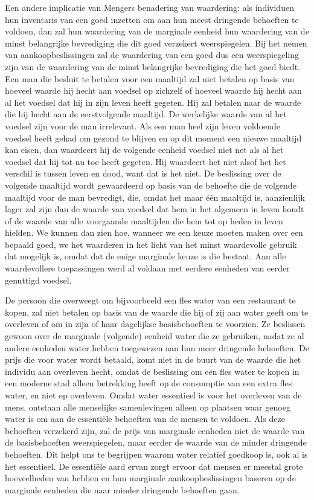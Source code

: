 Een andere implicatie van Mengers benadering van waardering: als individuen hun inventaris van een goed inzetten om aan hun meest dringende behoeften te voldoen, dan zal hun waardering van de marginale eenheid hun waardering van de minst belangrijke bevrediging die dit goed verzekert weerspiegelen. Bij het nemen van aankoopbeslissingen zal de waardering van een goed dus een weerspiegeling zijn van de waardering van de minst belangrijke bevrediging die het goed biedt. Een man die besluit te betalen voor een maaltijd zal niet betalen op basis van hoeveel waarde hij hecht aan voedsel op zichzelf of hoeveel waarde hij hecht aan al het voedsel dat hij in zijn leven heeft gegeten. Hij zal betalen naar de waarde die hij hecht aan de eerstvolgende maaltijd. De werkelijke waarde van al het voedsel zijn voor de man irrelevant. Als een man heel zijn leven voldoende voedsel heeft gehad om gezond te blijven en op dit moment een nieuwe maaltijd kan eisen, dan waardeert hij de volgende eenheid voedsel niet net als al het voedsel dat hij tot nu toe heeft gegeten. Hij waardeert het niet alsof het het verschil is tussen leven en dood, want dat is het niet. De beslissing over de volgende maaltijd wordt gewaardeerd op basis van de behoefte die de volgende maaltijd voor de man bevredigt, die, omdat het maar één maaltijd is, aanzienlijk lager zal zijn dan de waarde van voedsel dat hem in het algemeen in leven houdt of de waarde van alle voorgaande maaltijden die hem tot op heden in leven hielden. We kunnen dan zien hoe, wanneer we een keuze moeten maken over een bepaald goed, we het waarderen in het licht van het minst waardevolle gebruik dat mogelijk is, omdat dat de enige marginale keuze is die bestaat. Aan alle waardevollere toepassingen werd al voldaan met eerdere eenheden van eerder genuttigd voedsel. 

De persoon die overweegt om bijvoorbeeld een fles water van een restaurant te kopen, zal niet betalen op basis van de waarde die hij of zij aan water geeft om te overleven of om in zijn of haar dagelijkse basisbehoeften te voorzien. Ze beslissen gewoon over de marginale (volgende) eenheid water die ze gebruiken, nadat ze al andere eenheden water hebben toegewezen aan hun meer dringende behoeften. De prijs die voor water wordt betaald, komt niet in de buurt van de waarde die het individu aan overleven hecht, omdat de beslissing om een fles water te kopen in een moderne stad alleen betrekking heeft op de consumptie van een extra fles water, en niet op overleven. Omdat water essentieel is voor het overleven van de mens, ontstaan alle menselijke samenlevingen alleen op plaatsen waar genoeg water is om aan de essentiële behoeften van de mensen te voldoen. Als deze behoeften verzekerd zijn, zal de prijs van marginale eenheden niet de waarde van de basisbehoeften weerspiegelen, maar eerder de waarde van de minder dringende behoeften. Dit helpt ons te begrijpen waarom water relatief goedkoop is, ook al is het essentieel. De essentiële aard ervan zorgt ervoor dat mensen er meestal grote hoeveelheden van hebben en hun marginale aankoopbeslissingen baseren op de marginale eenheden die naar minder dringende behoeften gaan.

